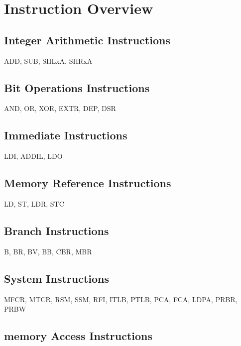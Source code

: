 %
%
\section*{Instruction Overview}


\subsection*{Integer Arithmetic Instructions}

ADD, SUB, SHLxA, SHRxA

\subsection*{Bit Operations Instructions}

AND, OR, XOR, EXTR, DEP, DSR

\subsection*{Immediate Instructions}

LDI, ADDIL, LDO

\subsection*{Memory Reference Instructions}

LD, ST, LDR, STC

\subsection*{Branch Instructions}

B, BR, BV, BB, CBR, MBR

\subsection*{System Instructions}

MFCR, MTCR, RSM, SSM, RFI, ITLB, PTLB, PCA, FCA, LDPA, PRBR, PRBW  


\subsection*{memory Access Instructions}


